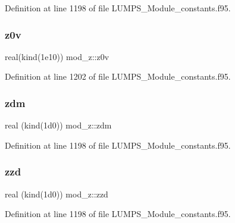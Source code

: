 Definition at line 1198 of file L\+U\+M\+P\+S\+\_\+\+Module\+\_\+constants.\+f95.

\mbox{\label{namespacemod__z_a62697e7e7a6c6a41258386a4a26ec1a7}} 
\subsubsection{\texorpdfstring{z0v}{z0v}}
{\footnotesize\ttfamily real(kind(1e10)) mod\+\_\+z\+::z0v}



Definition at line 1202 of file L\+U\+M\+P\+S\+\_\+\+Module\+\_\+constants.\+f95.

\mbox{\label{namespacemod__z_a85318ac2a4eb1313fc10432ff860214e}} 
\subsubsection{\texorpdfstring{zdm}{zdm}}
{\footnotesize\ttfamily real (kind(1d0)) mod\+\_\+z\+::zdm}



Definition at line 1198 of file L\+U\+M\+P\+S\+\_\+\+Module\+\_\+constants.\+f95.

\mbox{\label{namespacemod__z_ac1314dbe1ed7b4c92c501ced67f725c3}} 
\subsubsection{\texorpdfstring{zzd}{zzd}}
{\footnotesize\ttfamily real (kind(1d0)) mod\+\_\+z\+::zzd}



Definition at line 1198 of file L\+U\+M\+P\+S\+\_\+\+Module\+\_\+constants.\+f95.

